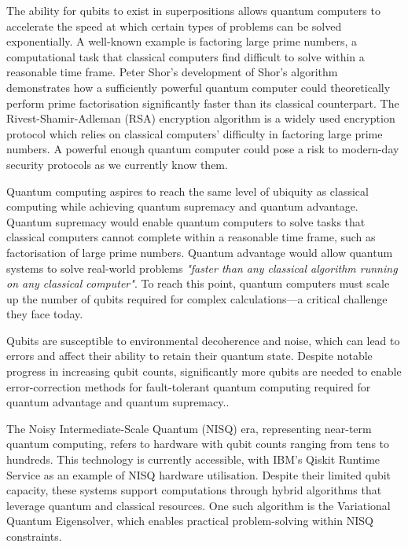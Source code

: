 \documentclass{article}
\begin{document}
{The ability for qubits to exist in superpositions allows quantum computers to accelerate the speed at which certain types of problems can be solved exponentially\cite{knowledgeacademy}. A well-known example is factoring large prime numbers, a computational task that classical computers find difficult to solve within a reasonable time frame. Peter Shor’s development of Shor’s algorithm demonstrates how a sufficiently powerful quantum computer could theoretically perform prime factorisation significantly faster than its classical counterpart\cite{Shor_1997}\cite{minutephysics}. The Rivest-Shamir-Adleman (RSA) encryption algorithm is a widely used encryption protocol which relies on classical computers' difficulty in factoring large prime numbers\cite{encryptionconsulting}. A powerful enough quantum computer could pose a risk to modern-day security protocols as we currently know them. 

Quantum computing aspires to reach the same level of ubiquity as classical computing while achieving quantum supremacy and quantum advantage. Quantum supremacy would enable quantum computers to solve tasks that classical computers cannot complete within a reasonable time frame, such as factorisation of large prime numbers\cite{quera}. Quantum advantage would allow quantum systems to solve real-world problems \textit{"faster than any classical algorithm running on any classical computer"}\cite{quera}. To reach this point, quantum computers must scale up the number of qubits required for complex calculations—a critical challenge they face today.

Qubits are susceptible to environmental decoherence and noise, which can lead to errors and affect their ability to retain their quantum state\cite{futurumcareers}. Despite notable progress in increasing qubit counts, significantly more qubits are needed to enable error-correction methods for fault-tolerant quantum computing required for quantum advantage and quantum supremacy.\cite{NewScientist}.

The Noisy Intermediate-Scale Quantum (NISQ) era, representing near-term quantum computing, refers to hardware with qubit counts ranging from tens to hundreds\cite{NISQ}. This technology is currently accessible, with IBM's Qiskit Runtime Service as an example of NISQ hardware utilisation\cite{ReleaseSummary}. Despite their limited qubit capacity, these systems support computations through hybrid algorithms that leverage quantum and classical resources. One such algorithm is the Variational Quantum Eigensolver, which enables practical problem-solving within NISQ constraints.

}
\end{document}
